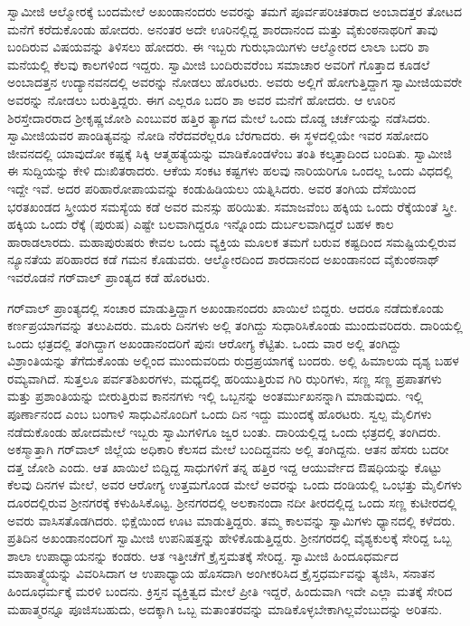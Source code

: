 ಸ್ವಾಮೀಜಿ ಆಲ್ಮೋರಕ್ಕೆ ಬಂದಮೇಲೆ ಅಖಂಡಾನಂದರು ಅವರನ್ನು ತಮಗೆ ಪೂರ್ವಪರಿಚಿತರಾದ ಅಂಬಾದತ್ತರ ತೋಟದ ಮನೆಗೆ ಕರೆದುಕೊಂಡು ಹೋದರು. ಅನಂತರ ಅದೇ ಊರಿನಲ್ಲಿದ್ದ ಶಾರದಾನಂದ ಮತ್ತು ವೈಕುಂಠನಾಥರಿಗೆ ತಾವು ಬಂದಿರುವ ವಿಷಯವನ್ನು ತಿಳಿಸಲು ಹೋದರು. ಈ ಇಬ್ಬರು ಗುರುಭಾಯಿಗಳು ಆಲ್ಮೋರದ ಲಾಲಾ ಬದರಿ ಶಾ ಮನೆಯಲ್ಲಿ ಕೆಲವು ಕಾಲಗಳಿಂದ ಇದ್ದರು. ಸ್ವಾಮೀಜಿ ಬಂದಿರುವರೆಂಬ ಸಮಾಚಾರ ಅವರಿಗೆ ಗೊತ್ತಾದ ಕೂಡಲೆ ಅಂಬಾದತ್ತನ ಉದ್ಯಾನವನದಲ್ಲಿ ಅವರನ್ನು ನೋಡಲು ಹೊರಟರು. ಅವರು ಅಲ್ಲಿಗೆ ಹೋಗುತ್ತಿದ್ದಾಗ ಸ್ವಾಮೀಜಿಯವರೇ ಅವರನ್ನು ನೋಡಲು ಬರುತ್ತಿದ್ದರು. ಈಗ ಎಲ್ಲರೂ ಬದರಿ ಶಾ ಅವರ ಮನೆಗೆ ಹೋದರು. ಆ ಊರಿನ ಶಿರಸ್ತೇದಾರರಾದ ಶ‍್ರೀಕೃಷ್ಣಜೋಶಿ ಎಂಬುವರ ಹತ್ತಿರ ತ್ಯಾಗದ ಮೇಲೆ ಒಂದು ದೊಡ್ಡ ಚರ್ಚೆಯನ್ನು ನಡೆಸಿದರು. ಸ್ವಾಮೀಜಿಯವರ ಪಾಂಡಿತ್ಯವನ್ನು ನೋಡಿ ನೆರೆದವರೆಲ್ಲರೂ ಬೆರಗಾದರು. ಈ ಸ್ಥಳದಲ್ಲಿಯೇ ಇವರ ಸಹೋದರಿ ಜೀವನದಲ್ಲಿ ಯಾವುದೋ ಕಷ್ಟಕ್ಕೆ ಸಿಕ್ಕಿ ಆತ್ಮಹತ್ಯೆಯನ್ನು ಮಾಡಿಕೊಂಡಳೆಂಬ ತಂತಿ ಕಲ್ಕತ್ತಾದಿಂದ ಬಂದಿತು. ಸ್ವಾಮೀಜಿ ಈ ಸುದ್ದಿಯನ್ನು ಕೇಳಿ ದುಃಖಿತರಾದರು. ಆಕೆಯ ಸಂಕಟ ಕಷ್ಟಗಳು ಹಲವು ನಾರಿಯರಿಗೂ ಒಂದಲ್ಲ ಒಂದು ವಿಧದಲ್ಲಿ ಇದ್ದೇ ಇವೆ. ಅದರ ಪರಿಹಾರೋಪಾಯವನ್ನು ಕಂಡುಹಿಡಿಯಲು ಯತ್ನಿಸಿದರು. ಅವರ ತಂಗಿಯ ದೆಸೆಯಿಂದ ಭರತಖಂಡದ ಸ್ತ್ರೀಯರ ಸಮಸ್ಯೆಯ ಕಡೆ ಅವರ ಮನಸ್ಸು ಹರಿಯಿತು. ಸಮಾಜವೆಂಬ ಹಕ್ಕಿಯ ಒಂದು ರೆಕ್ಕೆಯಂತೆ ಸ್ತ್ರೀ. ಹಕ್ಕಿಯ ಒಂದು ರೆಕ್ಕೆ (ಪುರುಷ) ಎಷ್ಟೇ ಬಲವಾಗಿದ್ದರೂ ಇನ್ನೊಂದು ದುರ್ಬಲವಾಗಿದ್ದರೆ ಬಹಳ ಕಾಲ ಹಾರಾಡಲಾರದು. ಮಹಾಪುರುಷರು ಕೇವಲ ಒಂದು ವ್ಯಕ್ತಿಯ ಮೂಲಕ ತಮಗೆ ಬರುವ ಕಷ್ಟದಿಂದ ಸಮಷ್ಟಿಯಲ್ಲಿರುವ ನ್ಯೂನತೆಯ ಪರಿಹಾರದ ಕಡೆ ಗಮನ ಕೊಡುವರು. ಆಲ್ಮೋರದಿಂದ ಶಾರದಾನಂದ ಅಖಂಡಾನಂದ ವೈಕುಂಠನಾಥ್ ಇವರೊಡನೆ ಗರ್​‍ವಾಲ್ ಪ್ರಾಂತ್ಯದ ಕಡೆ ಹೊರಟರು. 

ಗರ್​‍ವಾಲ್ ಪ್ರಾಂತ್ಯದಲ್ಲಿ ಸಂಚಾರ ಮಾಡುತ್ತಿದ್ದಾಗ ಅಖಂಡಾನಂದರು ಖಾಯಿಲೆ ಬಿದ್ದರು. ಆದರೂ ನಡೆದುಕೊಂಡು ಕರ್ಣಪ್ರಯಾಗವನ್ನು ತಲುಪಿದರು. ಮೂರು ದಿನಗಳು ಅಲ್ಲಿ ತಂಗಿದ್ದು ಸುಧಾರಿಸಿಕೊಂಡು ಮುಂದುವರಿದರು. ದಾರಿಯಲ್ಲಿ ಒಂದು ಛತ್ರದಲ್ಲಿ ತಂಗಿದ್ದಾಗ ಅಖಂಡಾನಂದರಿಗೆ ಪುನಃ ಆರೋಗ್ಯ ಕೆಟ್ಟಿತು. ಒಂದು ವಾರ ಅಲ್ಲಿ ತಂಗಿದ್ದು ವಿಶ್ರಾಂತಿಯನ್ನು ತೆಗೆದುಕೊಂಡು ಅಲ್ಲಿಂದ ಮುಂದುವರಿದು ರುದ್ರಪ್ರಯಾಗಕ್ಕೆ ಬಂದರು. ಅಲ್ಲಿ ಹಿಮಾಲಯ ದೃಶ್ಯ ಬಹಳ ರಮ್ಯವಾಗಿದೆ. ಸುತ್ತಲೂ ಪರ್ವತಶಿಖರಗಳು, ಮಧ್ಯದಲ್ಲಿ ಹರಿಯುತ್ತಿರುವ ಗಿರಿ ಝರಿಗಳು, ಸಣ್ಣ ಸಣ್ಣ ಪ್ರಪಾತಗಳು ಮತ್ತು ಪ್ರಶಾಂತಿಯನ್ನು ಬೀರುತ್ತಿರುವ ಕಾನನಗಳು ಇಲ್ಲಿ ಒಬ್ಬನನ್ನು ಅಂತರ್ಮುಖನನ್ನಾಗಿ ಮಾಡುವುದು. ಇಲ್ಲಿ ಪೂರ್ಣಾನಂದ ಎಂಬ ಬಂಗಾಳಿ ಸಾಧುವಿನೊಂದಿಗೆ ಒಂದು ದಿನ ಇದ್ದು ಮುಂದಕ್ಕೆ ಹೊರಟರು. ಸ್ವಲ್ಪ ಮೈಲಿಗಳು ನಡೆದುಕೊಂಡು ಹೋದಮೇಲೆ ಇಬ್ಬರು ಸ್ವಾಮಿಗಳಿಗೂ ಜ್ವರ ಬಂತು. ದಾರಿಯಲ್ಲಿದ್ದ ಒಂದು ಛತ್ರದಲ್ಲಿ ತಂಗಿದರು. ಅಕಸ್ಮಾತ್ತಾಗಿ ಗರ್​‍ವಾಲ್ ಜಿಲ್ಲೆಯ ಅಧಿಕಾರಿ ಕೆಲಸದ ಮೇಲೆ ಬಂದಿದ್ದವನು ಅಲ್ಲಿ ತಂಗಿದ್ದನು. ಆತನ ಹೆಸರು ಬದರೀ ದತ್ತ ಜೋಶಿ ಎಂದು. ಆತ ಖಾಯಿಲೆ ಬಿದ್ದಿದ್ದ ಸಾಧುಗಳಿಗೆ ತನ್ನ ಹತ್ತಿರ ಇದ್ದ ಆಯುರ್ವೇದ ಔಷಧಿಯನ್ನು ಕೊಟ್ಟು ಕೆಲವು ದಿನಗಳ ಮೇಲೆ, ಅವರ ಆರೋಗ್ಯ ಉತ್ತಮಗೊಂಡ ಮೇಲೆ ಅವರನ್ನು ಒಂದು ದಂಡಿಯಲ್ಲಿ ಒಂಭತ್ತು ಮೈಲಿಗಳು ದೂರದಲ್ಲಿರುವ ಶ‍್ರೀನಗರಕ್ಕೆ ಕಳುಹಿಸಿಕೊಟ್ಟ. ಶ‍್ರೀನಗರದಲ್ಲಿ ಅಲಕಾನಂದಾ ನದೀ ತೀರದಲ್ಲಿದ್ದ ಒಂದು ಸಣ್ಣ ಕುಟೀರದಲ್ಲಿ ಅವರು ವಾಸಿಸತೊಡಗಿದರು. ಭಿಕ್ಷೆಯಿಂದ ಊಟ ಮಾಡುತ್ತಿದ್ದರು. ತಮ್ಮ ಕಾಲವನ್ನು ಸ್ವಾಮಿಗಳು ಧ್ಯಾನದಲ್ಲಿ ಕಳೆದರು. ಪ್ರತಿದಿನ ಅಖಂಡಾನಂದರಿಗೆ ಸ್ವಾಮೀಜಿ ಉಪನಿಷತ್ತನ್ನು ಹೇಳಿಕೊಡುತ್ತಿದ್ದರು. ಶ‍್ರೀನಗರದಲ್ಲಿ ವೈಶ್ಯಕುಲಕ್ಕೆ ಸೇರಿದ್ದ ಒಬ್ಬ ಶಾಲಾ ಉಪಾಧ್ಯಾಯನನ್ನು ಕಂಡರು. ಆತ ಇತ್ತೀಚೆಗೆ ಕ್ರೈಸ್ತಮತಕ್ಕೆ ಸೇರಿದ್ದ. ಸ್ವಾಮೀಜಿ ಹಿಂದೂಧರ್ಮದ ಮಾಹಾತ್ಮ್ಯೆಯನ್ನು ವಿವರಿಸಿದಾಗ ಆ ಉಪಾಧ್ಯಾಯ ಹೊಸದಾಗಿ ಅಂಗೀಕರಿಸಿದ ಕ್ರೈಸ್ತಧರ್ಮವನ್ನು ತ್ಯಜಿಸಿ, ಸನಾತನ ಹಿಂದೂಧರ್ಮಕ್ಕೆ ಮರಳಿ ಬಂದನು. ಕ್ರಿಸ್ತನ ವ್ಯಕ್ತಿತ್ವದ ಮೇಲೆ ಪ್ರೀತಿ ಇದ್ದರೆ, ಹಿಂದುವಾಗಿ ಇದೇ ಎಲ್ಲಾ ಮತಕ್ಕೆ ಸೇರಿದ ಮಹಾತ್ಮರನ್ನೂ ಪೂಜಿಸಬಹುದು, ಅದಕ್ಕಾಗಿ ಒಬ್ಬ ಮತಾಂತರವನ್ನು ಮಾಡಿಕೊಳ್ಳಬೇಕಾಗಿಲ್ಲವೆಂಬುದನ್ನು ಅರಿತನು. 

